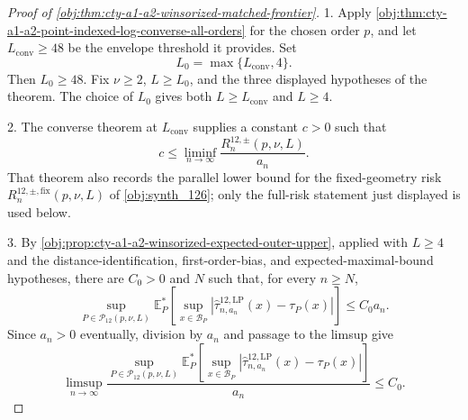 \documentclass[11pt]{article}
\begin{document}
\begin{proof}[Proof of \cref{obj:thm:cty-a1-a2-winsorized-matched-frontier}]
1. Apply \cref{obj:thm:cty-a1-a2-point-indexed-log-converse-all-orders} for the chosen order \(p\), and let \(L_{\mathrm{conv}}\ge 48\) be the envelope threshold it provides.  Set
\[
L_0=\max\{L_{\mathrm{conv}},4\}.
\]
Then \(L_0\ge 48\).  Fix \(\nu\ge 2\), \(L\ge L_0\), and the three displayed hypotheses of the theorem.  The choice of \(L_0\) gives both \(L\ge L_{\mathrm{conv}}\) and \(L\ge 4\).

2. The converse theorem at \(L_{\mathrm{conv}}\) supplies a constant \(c>0\) such that
\[
c
\le
\liminf_{n\to\infty}
\frac{R^{12,\pm}_n(p,\nu,L)}{a_n}.
\]
That theorem also records the parallel lower bound for the fixed-geometry risk \(R^{12,\pm,\mathrm{fix}}_n(p,\nu,L)\) of \cref{obj:synth_126}; only the full-risk statement just displayed is used below.

3. By \cref{obj:prop:cty-a1-a2-winsorized-expected-outer-upper}, applied with \(L\ge 4\) and the distance-identification, first-order-bias, and expected-maximal-bound hypotheses, there are \(C_0>0\) and \(N\) such that, for every \(n\ge N\),
\[
\sup_{P\in\mathcal P_{12}(p,\nu,L)}
\mathbb E_P^*\!\left[
\sup_{x\in\mathcal B_P}
\left|\widehat\tau^{12,\mathrm{LP}}_{n,a_n}(x)-\tau_P(x)\right|
\right]
\le C_0 a_n .
\]
Since \(a_n>0\) eventually, division by \(a_n\) and passage to the limsup give
\[
\limsup_{n\to\infty}
\frac{
\sup_{P\in\mathcal P_{12}(p,\nu,L)}
\mathbb E_P^*\!\left[
\sup_{x\in\mathcal B_P}
\left|\widehat\tau^{12,\mathrm{LP}}_{n,a_n}(x)-\tau_P(x)\right|
\right]}
{a_n}
\le C_0 .
\]


\end{proof}
\end{document}
